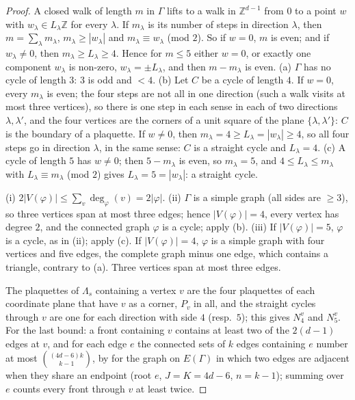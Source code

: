 \documentclass[11pt,a4paper]{article}
\theoremstyle{definition}
\theoremstyle{remark}
\newcommand{\Z}{\mathbb{Z}}
\newcommand{\IIIref}[3]{\cite[#1~`#2' (\texttt{#3})]{III}}
\begin{document}
\begin{proof}
A closed walk of length $m$ in $\Gamma$ lifts to a walk in $\Z^{d-1}$ from $0$ to a point $w$ with $w_\lambda\in L_\lambda\Z$ for every $\lambda$. If
$m_\lambda$ is its number of steps in direction $\lambda$, then $m=\sum_\lambda m_\lambda$, $m_\lambda\ge|w_\lambda|$ and $m_\lambda\equiv w_\lambda$ (mod $2$).
So if $w=0$, $m$ is even; and if $w_\lambda\ne0$, then $m_\lambda\ge L_\lambda\ge4$. Hence for $m\le5$ either $w=0$, or exactly one component $w_\lambda$ is
non-zero, $w_\lambda=\pm L_\lambda$, and then $m-m_\lambda$ is even. (a) $\Gamma$ has no cycle of length $3$: $3$ is odd and $<4$. (b) Let $C$ be a cycle
of length $4$. If $w=0$, every $m_\lambda$ is even; the four steps are not all in one direction (such a walk visits at most three vertices), so there is
one step in each sense in each of two directions $\lambda,\lambda'$, and the four vertices are the corners of a unit square of the plane
$\{\lambda,\lambda'\}$: $C$ is the boundary of a plaquette. If $w\ne0$, then $m_\lambda=4\ge L_\lambda=|w_\lambda|\ge4$, so all four steps go in direction
$\lambda$, in the same sense: $C$ is a straight cycle and $L_\lambda=4$. (c) A cycle of length $5$ has $w\ne0$; then $5-m_\lambda$ is even, so
$m_\lambda=5$, and $4\le L_\lambda\le m_\lambda$ with $L_\lambda\equiv m_\lambda$ (mod $2$) gives $L_\lambda=5=|w_\lambda|$: a straight cycle.

(i) $2|V(\varphi)|\le\sum_v\deg_\varphi(v)=2|\varphi|$. (ii) $\Gamma$ is a simple graph (all sides are $\ge3$), so three vertices span at most three edges;
hence $|V(\varphi)|=4$, every vertex has degree $2$, and the connected graph $\varphi$ is a cycle; apply (b). (iii) If $|V(\varphi)|=5$, $\varphi$ is a cycle,
as in (ii); apply (c). If $|V(\varphi)|=4$, $\varphi$ is a simple graph with four vertices and five edges, the complete graph minus one edge, which contains a
triangle, contrary to (a). Three vertices span at most three edges.

The plaquettes of $\Lambda_s$ containing a vertex $v$ are the four plaquettes of each coordinate plane that have $v$ as a corner, $P_v$ in all, and
the straight cycles through $v$ are one for each direction with side $4$ (resp.\ $5$); this gives $N^v_4$ and $N^v_5$. For the last bound: a front
containing $v$ contains at least two of the $2(d-1)$ edges at $v$, and for each edge $e$ the connected sets of $k$ edges containing $e$ number at most
$\binom{(4d-6)k}{k-1}$, by \IIIref{Lemma}{Rooted counting}{al:lem:rooted} for the graph on $E(\Gamma)$ in which two edges are adjacent when they share
an endpoint (root $e$, $J=K=4d-6$, $n=k-1$); summing over $e$ counts every front through $v$ at least twice.
\end{proof}
\end{document}
